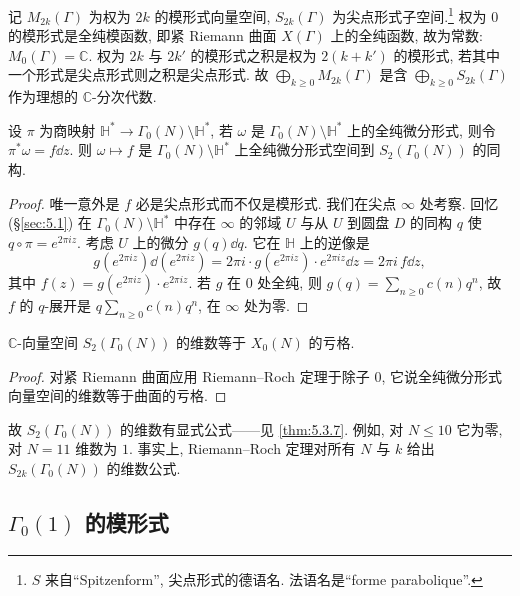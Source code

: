 记 $M_{2k}(\Gamma)$ 为权为 $2k$ 的模形式向量空间, $S_{2k}(\Gamma)$ 为尖点形式子空间.\footnote{$S$ 来自``Spitzenform'', 尖点形式的德语名. 法语名是``forme parabolique''.} 权为 $0$ 的模形式是全纯模函数, 即紧 Riemann 曲面 $X(\Gamma)$ 上的全纯函数, 故为常数: $M_0(\Gamma) = \mathbb{C}$. 权为 $2k$ 与 $2k'$ 的模形式之积是权为 $2(k+k')$ 的模形式, 若其中一个形式是尖点形式则之积是尖点形式. 故 $\bigoplus_{k\ge 0}M_{2k}(\Gamma)$ 是含 $\bigoplus_{k\ge 0}S_{2k}(\Gamma)$ 作为理想的 $\mathbb{C}$-分次代数.

\begin{proposition} \label{thm:5.3.3} 
设 $\pi$ 为商映射 $\mathbb{H}^*\to\Gamma_0(N)\setminus\mathbb{H}^*$, 若 $\omega$ 是 $\Gamma_0(N)\setminus\mathbb{H}^*$ 上的全纯微分形式, 则令 $\pi^*\omega = f\dd z$. 则 $\omega\mapsto f$ 是 $\Gamma_0(N)\setminus\mathbb{H}^*$ 上全纯微分形式空间到 $S_2(\Gamma_0(N))$ 的同构.
\end{proposition}

\begin{proof}
唯一意外是 $f$ 必是尖点形式而不仅是模形式. 我们在尖点 $\infty$ 处考察. 回忆 (\S\ref{sec:5.1}) 在 $\Gamma_0(N)\setminus\mathbb{H}^*$ 中存在 $\infty$ 的邻域 $U$ 与从 $U$ 到圆盘 $D$ 的同构 $q$ 使 $q\circ\pi = e^{2\pi iz}$. 考虑 $U$ 上的微分 $g(q)\dd q$. 它在 $\mathbb{H}$ 上的逆像是
\[
g(e^{2\pi iz})\dd (e^{2\pi iz}) = 2\pi i\cdot g(e^{2\pi iz})\cdot e^{2\pi iz}\dd z = 2\pi i\,f\dd z,
\]
其中 $f(z) = g(e^{2\pi iz})\cdot e^{2\pi iz}$. 若 $g$ 在 $0$ 处全纯, 则 $g(q) = \sum_{n\ge 0}c(n)q^n$, 故 $f$ 的 $q$-展开是 $q\sum_{n\ge 0}c(n)q^n$, 在 $\infty$ 处为零.
\end{proof}

\begin{corollary} \label{thm:5.3.4} 
$\mathbb{C}$-向量空间 $S_2(\Gamma_0(N))$ 的维数等于 $X_0(N)$ 的亏格.
\end{corollary}

\begin{proof}
对紧 Riemann 曲面应用 Riemann--Roch 定理于除子 $0$, 它说全纯微分形式向量空间的维数等于曲面的亏格.
\end{proof}

故 $S_2(\Gamma_0(N))$ 的维数有显式公式——见 \ref{thm:5.3.7}. 例如, 对 $N\le 10$ 它为零, 对 $N = 11$ 维数为 $1$. 事实上, Riemann--Roch 定理对所有 $N$ 与 $k$ 给出 $S_{2k}(\Gamma_0(N))$ 的维数公式.

\subsection*{$\Gamma_0(1)$ 的模形式}

